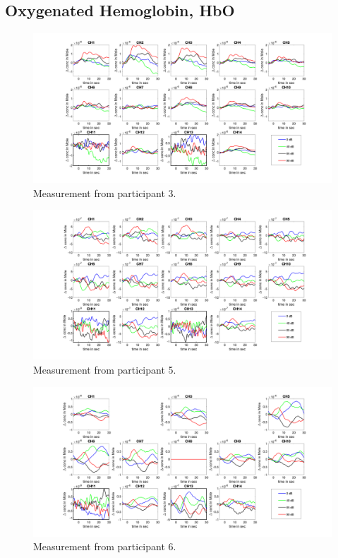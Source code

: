\subsection{Oxygenated Hemoglobin, HbO}
\begin{figure}[H]
  \centering
    \includegraphics[scale=.4]{bilder/HbO_Mole/sub_jonas_s_HbO.png}
  \caption{Measurement from participant 3.}
  \label{fig:somesignal}
\end{figure}

\begin{figure}[H]
  \centering
    \includegraphics[scale=.4]{bilder/HbO_Mole/sub_lukas_s_HbO.png}
  \caption{Measurement from participant 5.}
  \label{fig:somesignal}
\end{figure}

\begin{figure}[H]
  \centering
    \includegraphics[scale=.4]{bilder/HbO_Mole/sub_shelia_s_HbO.png}
  \caption{Measurement from participant 6.}
  \label{fig:somesignal}
\end{figure}

